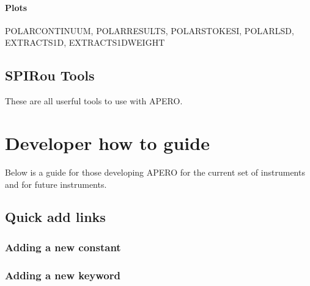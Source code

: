 \documentclass[a4paper,10pt,english]{report}
\begin{document}
\paragraph{Plots}
\label{\detokenize{user/spirou/recipes/polar:plots}}
\begin{sphinxVerbatim}[commandchars=\\\{\}]
POLAR\PYGZus{}CONTINUUM, POLAR\PYGZus{}RESULTS, POLAR\PYGZus{}STOKES\PYGZus{}I, POLAR\PYGZus{}LSD,
EXTRACT\PYGZus{}S1D, EXTRACT\PYGZus{}S1D\PYGZus{}WEIGHT
\end{sphinxVerbatim}


\subsection{SPIRou Tools}
\label{\detokenize{user/spirou/tools_spirou:spirou-tools}}\label{\detokenize{user/spirou/tools_spirou:tools-spirou}}\label{\detokenize{user/spirou/tools_spirou::doc}}
These are all userful tools to use with APERO.


\section{Developer how to guide}
\label{\detokenize{dev/developer_guide:developer-how-to-guide}}\label{\detokenize{dev/developer_guide:dev-main}}\label{\detokenize{dev/developer_guide::doc}}
Below is a guide for those developing APERO for the current set of instruments
and for future instruments.


\subsection{Quick add links}
\label{\detokenize{dev/developer_guide:quick-add-links}}\label{\detokenize{dev/developer_guide:dev-main-quicklinks}}

\subsubsection{Adding a new constant}
\label{\detokenize{dev/adding_new_constant:adding-a-new-constant}}\label{\detokenize{dev/adding_new_constant:add-new-constant}}\label{\detokenize{dev/adding_new_constant::doc}}

\subsubsection{Adding a new keyword}
\label{\detokenize{dev/adding_new_keyword:adding-a-new-keyword}}\label{\detokenize{dev/adding_new_keyword:adding-new-keyword}}\label{\detokenize{dev/adding_new_keyword::doc}}
\end{document}
